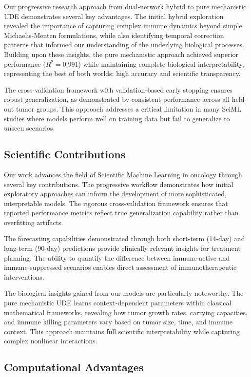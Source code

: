 \documentclass{juliacon}
\begin{document}
Our progressive research approach from dual-network hybrid to pure mechanistic UDE demonstrates several key advantages. The initial hybrid exploration revealed the importance of capturing complex immune dynamics beyond simple Michaelis-Menten formulations, while also identifying temporal correction patterns that informed our understanding of the underlying biological processes. Building upon these insights, the pure mechanistic approach achieved superior performance ($R^2 = 0.991$) while maintaining complete biological interpretability, representing the best of both worlds: high accuracy and scientific transparency.

The cross-validation framework with validation-based early stopping ensures robust generalization, as demonstrated by consistent performance across all held-out tumor groups. This approach addresses a critical limitation in many SciML studies where models perform well on training data but fail to generalize to unseen scenarios.

\subsection{Scientific Contributions}

Our work advances the field of Scientific Machine Learning in oncology through several key contributions. The progressive workflow demonstrates how initial exploratory approaches can inform the development of more sophisticated, interpretable models. The rigorous cross-validation framework ensures that reported performance metrics reflect true generalization capability rather than overfitting artifacts.

The forecasting capabilities demonstrated through both short-term (14-day) and long-term (90-day) predictions provide clinically relevant insights for treatment planning. The ability to quantify the difference between immune-active and immune-suppressed scenarios enables direct assessment of immunotherapeutic interventions.

The biological insights gained from our models are particularly noteworthy. The pure mechanistic UDE learns context-dependent parameters within classical mathematical frameworks, revealing how tumor growth rates, carrying capacities, and immune killing parameters vary based on tumor size, time, and immune context. This approach maintains full scientific interpretability while capturing complex nonlinear interactions.

\subsection{Computational Advantages}
\end{document}
